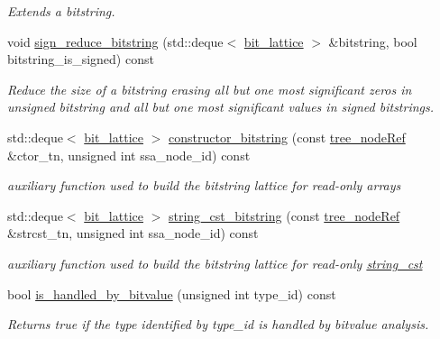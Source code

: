 \begin{DoxyCompactItemize}
\begin{DoxyCompactList}\small\item\em Extends a bitstring. \end{DoxyCompactList}\item 
void \hyperlink{classBitLatticeManipulator_a1783e3d23d32aed27ec5ada1229516dc}{sign\+\_\+reduce\+\_\+bitstring} (std\+::deque$<$ \hyperlink{bit__lattice_8hpp_ab732360111c810c4eaeb4c8b81d160d6}{bit\+\_\+lattice} $>$ \&bitstring, bool bitstring\+\_\+is\+\_\+signed) const
\begin{DoxyCompactList}\small\item\em Reduce the size of a bitstring erasing all but one most significant zeros in unsigned bitstring and all but one most significant values in signed bitstrings. \end{DoxyCompactList}\item 
std\+::deque$<$ \hyperlink{bit__lattice_8hpp_ab732360111c810c4eaeb4c8b81d160d6}{bit\+\_\+lattice} $>$ \hyperlink{classBitLatticeManipulator_aa0f6e165b5ecfb6894eaa75275cbb58b}{constructor\+\_\+bitstring} (const \hyperlink{tree__node_8hpp_a6ee377554d1c4871ad66a337eaa67fd5}{tree\+\_\+node\+Ref} \&ctor\+\_\+tn, unsigned int ssa\+\_\+node\+\_\+id) const
\begin{DoxyCompactList}\small\item\em auxiliary function used to build the bitstring lattice for read-\/only arrays \end{DoxyCompactList}\item 
std\+::deque$<$ \hyperlink{bit__lattice_8hpp_ab732360111c810c4eaeb4c8b81d160d6}{bit\+\_\+lattice} $>$ \hyperlink{classBitLatticeManipulator_a0880fc86301b0fbd131c668d79819e78}{string\+\_\+cst\+\_\+bitstring} (const \hyperlink{tree__node_8hpp_a6ee377554d1c4871ad66a337eaa67fd5}{tree\+\_\+node\+Ref} \&strcst\+\_\+tn, unsigned int ssa\+\_\+node\+\_\+id) const
\begin{DoxyCompactList}\small\item\em auxiliary function used to build the bitstring lattice for read-\/only \hyperlink{structstring__cst}{string\+\_\+cst} \end{DoxyCompactList}\item 
bool \hyperlink{classBitLatticeManipulator_ad148175c9bd6d44c0e75a6af94deedc8}{is\+\_\+handled\+\_\+by\+\_\+bitvalue} (unsigned int type\+\_\+id) const
\begin{DoxyCompactList}\small\item\em Returns true if the type identified by type\+\_\+id is handled by bitvalue analysis. \end{DoxyCompactList}\item 

\end{DoxyCompactItemize}
